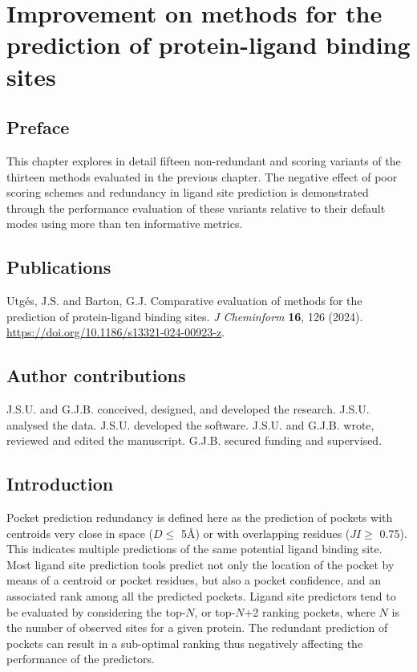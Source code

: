 \chapter{Improvement on methods for the prediction of protein-ligand binding sites}
\label{chap:LBS_IMPROV}

\section*{Preface}

This chapter explores in detail fifteen non-redundant and scoring variants of the thirteen methods evaluated in the previous chapter. The negative effect of poor scoring schemes and redundancy in ligand site prediction is demonstrated through the performance evaluation of these variants relative to their default modes using more than ten informative metrics.

\section*{Publications}

Utgés, J.S. and Barton, G.J. Comparative evaluation of methods for the prediction of protein-ligand binding sites. \textit{J Cheminform} \textbf{16}, 126 (2024). \url{https://doi.org/10.1186/s13321-024-00923-z}.

\section*{Author contributions}

J.S.U. and G.J.B. conceived, designed, and developed the research. J.S.U. analysed the data. J.S.U. developed the software. J.S.U. and G.J.B. wrote, reviewed and edited the manuscript. G.J.B. secured funding and supervised.

\section{Introduction}

Pocket prediction redundancy is defined here as the prediction of pockets with centroids very close in space ($D \leq$ 5\AA{}) or with overlapping residues ($JI \geq$ 0.75). This indicates multiple predictions of the same potential ligand binding site. Most ligand site prediction tools predict not only the location of the pocket by means of a centroid or pocket residues, but also a pocket confidence, and an associated rank among all the predicted pockets. Ligand site predictors tend to be evaluated by considering the top-$N$, or top-$N$+2 ranking pockets, where $N$ is the number of observed sites for a given protein. The redundant prediction of pockets can result in a sub-optimal ranking thus negatively affecting the performance of the predictors.

